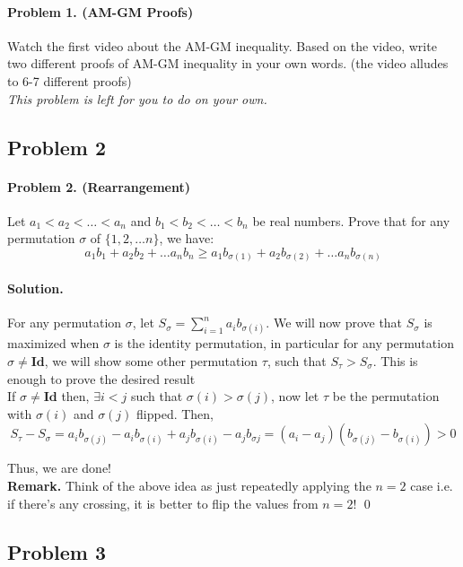 \documentclass[12pt]{article}
\newenvironment{solution}
{\paragraph{Solution.}}
{\qed\eject}
\begin{document}
\paragraph{\textbf{Problem 1. (AM-GM Proofs)}} Watch the first video about the AM-GM inequality. Based on the video, write two different proofs of AM-GM inequality in your own words. (the video alludes to 6-7 different proofs)\\

\textit{This problem is left for you to do on your own.}

\subsection*{Problem 2}

\paragraph{\textbf{Problem 2. (Rearrangement)}} Let $a_1<a_2<\ldots <a_n$ and $b_1<b_2<\ldots < b_n$ be real numbers. Prove that for any permutation $\sigma$ of $\{1,2,\ldots n\}$, we have: \[a_1b_1+a_2b_2+\ldots a_nb_n \ge a_1b_{\sigma(1)}+a_2b_{\sigma(2)}+\ldots a_nb_{\sigma(n)}\]

\begin{solution}
    For any permutation $\sigma$, let $S_{\sigma}=\sum\limits_{i=1}^{n}a_ib_{\sigma(i)}$. We will now prove that $S_{\sigma}$ is maximized when $\sigma$ is the identity permutation, in particular for any permutation $\sigma\ne \textbf{Id}$, we will show some other permutation $\tau$, such that $S_{\tau}>S_{\sigma}$. This is enough to prove the desired result\\
    
    If $\sigma\ne \textbf{Id}$ then, $\exists i<j$ such that $\sigma(i)>\sigma(j)$, now let $\tau$ be the permutation with $\sigma(i)$ and $\sigma(j)$ flipped. Then, \[S_{\tau}-S_{\sigma}=a_ib_{\sigma(j)}-a_ib_{\sigma(i)}+a_{j}b_{\sigma(i)}-a_jb_{\sigma{j}}=(a_i-a_j)(b_{\sigma(j)}-b_{\sigma(i)})>0\]

    Thus, we are done!\\

    \textbf{Remark.} Think of the above idea as just repeatedly applying the $n=2$ case i.e. if there's any crossing, it is better to flip the values from $n=2$!
\end{solution}

\subsection*{Problem 3}
\end{document}
